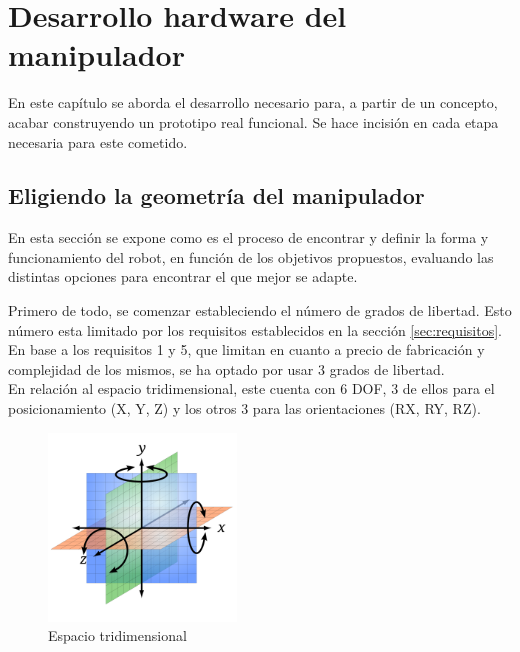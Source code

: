 \chapter{Desarrollo hardware del manipulador}
\label{cap:capitulo5}

\vspace{1cm}

En este capítulo se aborda el desarrollo necesario para, a partir de un concepto, acabar construyendo un prototipo real funcional. Se 
hace incisión en cada etapa necesaria para este cometido.

\section{Eligiendo la geometría del manipulador}
\label{sec:eligiendo_geometría}
En esta sección se expone como es el proceso de encontrar y definir la forma y funcionamiento del robot, en función de 
los objetivos propuestos, evaluando las distintas opciones para encontrar el que mejor se adapte.  


Primero de todo, se comenzar estableciendo el número de grados de libertad. Esto número esta limitado por los requisitos 
establecidos en la sección \ref{sec:requisitos}. En base a los requisitos 1 y 5, que limitan en cuanto a precio de fabricación y 
complejidad de los mismos, se ha optado por usar 3 grados de libertad.\\

En relación al espacio tridimensional, este cuenta con 6 \acs{DOF}, 3 de ellos para el 
posicionamiento (X, Y, Z) y los otros 3 para las orientaciones (RX, RY, RZ).

\begin{figure} [ht!]
  \begin{center}
    \includegraphics[width=5cm]{figs/coordinates.png}
  \end{center}
  \caption{Espacio tridimensional}
  \label{fig:espacio_tridimensional}
\end{figure}\ 

